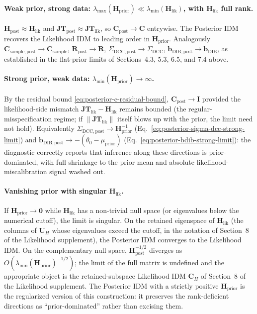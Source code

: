 \documentclass[11pt]{article}
\begin{document}
\paragraph{Weak prior, strong data: $\lambda_{\max}(\mathbf H_{\mathrm{prior}}) \ll \lambda_{\min}(\mathbf H_{\mathrm{lik}})$, with $\mathbf H_{\mathrm{lik}}$ full rank.}
$\mathbf H_{\mathrm{post}} \approx \mathbf H_{\mathrm{lik}}$ and $\mathbf{JT}_{\mathrm{post}} \approx \mathbf{JT}_{\mathrm{lik}}$, so $\mathbf C_{\mathrm{post}} \to \mathbf C$ entrywise. The Posterior IDM recovers the Likelihood IDM to leading order in $\mathbf H_{\mathrm{prior}}$. Analogously $\mathbf C_{\mathrm{sample},\mathrm{post}} \to \mathbf C_{\mathrm{sample}}$, $\mathbf R_{\mathrm{post}} \to \mathbf R$, $\Sigma_{\mathrm{DCC},\mathrm{post}} \to \Sigma_{\mathrm{DCC}}$, $\mathbf b_{\mathrm{DIB},\mathrm{post}} \to \mathbf b_{\mathrm{DIB}}$, as established in the flat-prior limits of Sections~4.3, 5.3, 6.5, and 7.4 above.

\paragraph{Strong prior, weak data: $\lambda_{\min}(\mathbf H_{\mathrm{prior}}) \to \infty$.}
By the residual bound \eqref{eq:posterior-c-residual-bound}, $\mathbf C_{\mathrm{post}} \to \mathbf I$ provided the likelihood-side mismatch $\mathbf{JT}_{\mathrm{lik}} - \mathbf H_{\mathrm{lik}}$ remains bounded (the regular-misspecification regime; if $\|\mathbf{JT}_{\mathrm{lik}}\|$ itself blows up with the prior, the limit need not hold). Equivalently $\Sigma_{\mathrm{DCC},\mathrm{post}} \to \mathbf H_{\mathrm{prior}}^{-1}$ (Eq.~\eqref{eq:posterior-sigma-dcc-strong-limit}) and $\mathbf b_{\mathrm{DIB},\mathrm{post}} \to -(\theta_0 - \mu_{\mathrm{prior}})$ (Eq.~\eqref{eq:posterior-bdib-strong-limit}): the diagnostic correctly reports that inference along these directions is prior-dominated, with full shrinkage to the prior mean and absolute likelihood-miscalibration signal washed out.

\paragraph{Vanishing prior with singular $\mathbf H_{\mathrm{lik}}$.}
If $\mathbf H_{\mathrm{prior}} \to \mathbf 0$ while $\mathbf H_{\mathrm{lik}}$ has a non-trivial null space (or eigenvalues below the numerical cutoff), the limit is singular. On the retained eigenspace of $\mathbf H_{\mathrm{lik}}$ (the columns of $\mathbf U_H$ whose eigenvalues exceed the cutoff, in the notation of Section~8 of the Likelihood supplement), the Posterior IDM converges to the Likelihood IDM. On the complementary null space, $\mathbf H_{\mathrm{post}}^{-1/2}$ diverges as $O(\lambda_{\min}(\mathbf H_{\mathrm{prior}})^{-1/2})$; the limit of the full matrix is undefined and the appropriate object is the retained-subspace Likelihood IDM $\mathbf C_H$ of Section~8 of the Likelihood supplement. The Posterior IDM with a strictly positive $\mathbf H_{\mathrm{prior}}$ is the regularized version of this construction: it preserves the rank-deficient directions as ``prior-dominated'' rather than excising them.
\end{document}
